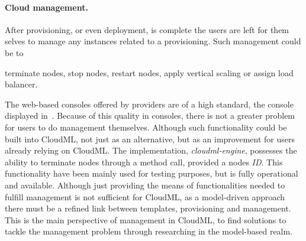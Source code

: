 \paragraph{Cloud management.}

After provisioning, or even deployment, is complete the users are left for them selves to
manage any instances related to a provisioning.
Such management could be to 
\begin{ii}
  \iitem terminate nodes, 
  \iitem stop nodes, 
  \iitem restart nodes,
  \iitem apply vertical scaling or
  \iitem assign load balancer.
\end{ii}
The web-based consoles offered by providers are of a high standard,
\eg the  console displayed in~.
Because of this quality in consoles, 
there is not a greater problem for users to do management themselves.
Although such functionality could be built into CloudML,
not just as an alternative, 
but as an improvement for users already relying on CloudML.
The implementation, \emph{cloudml-engine}, possesses the ability to terminate nodes
through a method call, provided a nodes \emph{ID}. 
This functionality have been mainly used for testing purposes, 
but is fully operational and available.
Although just providing the means of functionalities needed to fulfill management is not
sufficient for CloudML, as a model-driven approach there must be a
refined link between templates, provisioning and management.
This is the main perspective of management in CloudML,
to find solutions to tackle the management problem through researching in the model-based realm.
